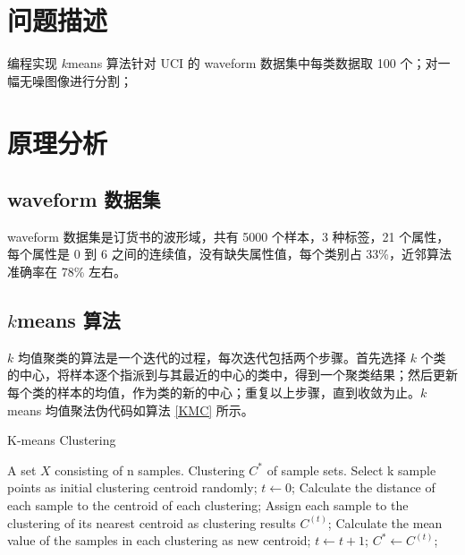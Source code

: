 \documentclass[12pt,AutoFakeBold]{article}
\begin{document}
\maketitle
\setcounter{tocdepth}{2}

\tableofcontents  %

\makeatletter
\begin{center}
    \LARGE \textbf{\textsf{\@problem}}
\end{center}
\makeatother


\section{问题描述}

编程实现 $k$means 算法针对 UCI 的 waveform 数据集中每类数据取 100 个；对一幅无噪图像进行分割；

\section{原理分析}

\subsection{waveform 数据集}

waveform 数据集是订货书的波形域，共有 5000 个样本，3 种标签，21 个属性，每个属性是 0 到 6 之间的连续值，没有缺失属性值，每个类别占 33\%，近邻算法准确率在 78\% 左右。


\subsection{$k$means 算法}

$k$ 均值聚类的算法是一个迭代的过程，每次迭代包括两个步骤。首先选择 $k$ 个类的中心，将样本逐个指派到与其最近的中心的类中，得到一个聚类结果；然后更新每个类的样本的均值，作为类的新的中心；重复以上步骤，直到收敛为止。$k$means 均值聚法伪代码如算法 \ref{KMC} 所示。 
%
\begin{algorithm}[hbtp]
	\caption{K-means Clustering} \label{KMC}
	\begin{algorithmic}[1]
	\Require A set $X$ consisting of n samples.
	\Ensure Clustering $C^*$ of sample sets.
	\State Select k sample points as initial clustering centroid randomly;
	\State $t\leftarrow0$;
		\State Calculate the distance of each sample to the centroid of each clustering;
		\State Assign each sample to the clustering of its nearest centroid as clustering results $C^{(t)}$;
		\State Calculate the mean value of the samples in each clustering as new centroid;
		\State $t\leftarrow t+1$;
	\EndWhile
	\State $C^*\leftarrow C^{(t)}$;
	\end{algorithmic}
\end{algorithm}
\end{document}
